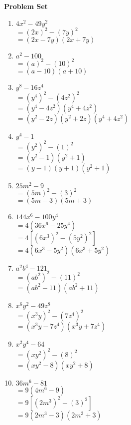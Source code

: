 \textbf{Problem Set}

\vspce
\begin{enumerate}

\item \hspce $4x^{2} - 49y^{2}$\\
$=(2 x )^2 - (7 y)^2$\\
$= \left(2 x - 7 y\right) \left(2 x + 7 y\right)$

\item \hspce $a^{2} - 100$\\
$=(a)^2 - (10)^2$\\
$= \left(a - 10\right) \left(a + 10\right)$

\item \hspce $y^{8} - 16z^{4}$\\
$=(y^{4})^2 - (4 z^{2})^2$\\
$= \left(y^{4} - 4 z^{2}\right) \left(y^{4} + 4 z^{2}\right)$\\
$= \left(y^{2} - 2 z\right) \left(y^{2} + 2 z\right) \left(y^{4} + 4 z^{2}\right)$

\item \hspce $y^{4} - 1$\\
$=(y^{2})^2 - (1)^2$\\
$= \left(y^{2} - 1\right) \left(y^{2} + 1\right)$\\
$= \left(y - 1\right) \left(y + 1\right) \left(y^{2} + 1\right)$

\item \hspce $25m^{2} - 9$\\
$=(5 m)^2 - (3)^2$\\
$= \left(5 m - 3\right) \left(5 m + 3\right)$

\item \hspce $144x^{6} - 100y^{4}$\\
$=4(36x^{6} - 25y^{4}) $\\
$=4[(6 x^{3})^2 - (5 y^{2})^2]$\\
$= 4 \left(6 x^{3} - 5 y^{2}\right) \left(6 x^{3} + 5 y^{2}\right)$

\item \hspce $a^{2}b^4 - 121$\\
$=(ab^2)^2 - (11)^2$\\
$= \left(a b^{2} - 11\right) \left(a b^{2} + 11\right)$

\item \hspce $x^{6}y^2 - 49z^{8}$\\
$=(x^{3} y)^2 - (7z^{4})^2$\\
$= \left(x^{3} y - 7 z^{4}\right) \left(x^{3} y + 7 z^{4}\right)$

\item \hspce $x^2y^{4} - 64$\\
$=(x y^{2})^2 - (8)^2$\\
$= \left(x y^{2} - 8\right) \left(x y^{2} + 8\right)$

\item \hspce $36m^{6} - 81$\\
$=9(4m^{6} - 9)$\\
$=9[(2 m^{3} )^2 - (3)^2]$\\
$= 9 \left(2 m^{3} - 3\right) \left(2 m^{3} + 3\right)$


\end{enumerate}
